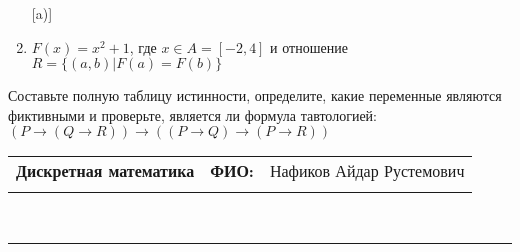 \documentclass[10pt]{exam}
\newcommand{\class}{Дискретная математика}
\newcommand{\examdate}{}
\begin{document}
\begin{questions}
\begin{enumerate} [a)]
\item $F(x)=x^{2}+1$, где $x \in A = [-2, 4]$ и отношение $R = \{(a,b)|F(a) = F(b)\}$
\end{enumerate}\question Составьте полную таблицу истинности, определите, какие переменные являются фиктивными и проверьте, является ли формула тавтологией:
$(P \rightarrow (Q \rightarrow R)) \rightarrow ((P \rightarrow Q) \rightarrow (P \rightarrow R))$

\end{questions}
\newpage
\begin{flushright}
\begin{tabular}{p{2.8in} r l}
\textbf{\class} & \textbf{ФИО:} &Нафиков Айдар Рустемович
\\

\textbf{\examdate} &&\\
\end{tabular}\\
\end{flushright}
\rule[1ex]{\textwidth}{.1pt}
\end{document}
